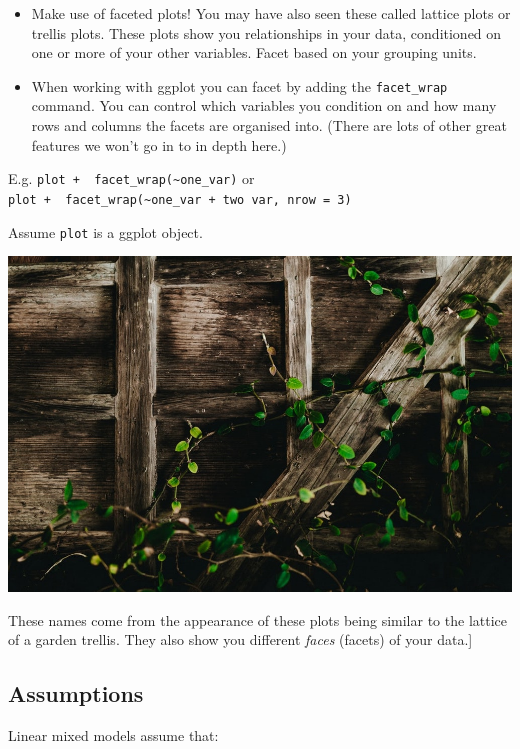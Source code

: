 \documentclass[
  openany]{book}
\providecommand{\tightlist}{%
  \setlength{\itemsep}{0pt}\setlength{\parskip}{0pt}}
\begin{document}
\begin{itemize}
\tightlist
\item
  Make use of faceted plots! You may have also seen these called lattice plots or trellis plots. These plots show you relationships in your data, conditioned on one or more of your other variables. Facet based on your grouping units.
\item
  When working with ggplot you can facet by adding the \texttt{facet\_wrap} command. You can control which variables you condition on and how many rows and columns the facets are organised into. (There are lots of other great features we won't go in to in depth here.)
\end{itemize}

E.g. \texttt{plot\ +\ \ facet\_wrap(\textasciitilde{}one\_var)} or
\texttt{plot\ +\ \ facet\_wrap(\textasciitilde{}one\_var\ +\ two\ var,\ nrow\ =\ 3)}

Assume \texttt{plot} is a ggplot object.

\begin{center}\includegraphics[width=1\linewidth]{images/m3/trellis} \end{center}

These names come from the appearance of these plots being similar to the lattice of a garden trellis. They also show you different \emph{faces} (facets) of your data.{]}

\hypertarget{assumptions-3}{%
\subsection{Assumptions}\label{assumptions-3}}

Linear mixed models assume that:
\end{document}
